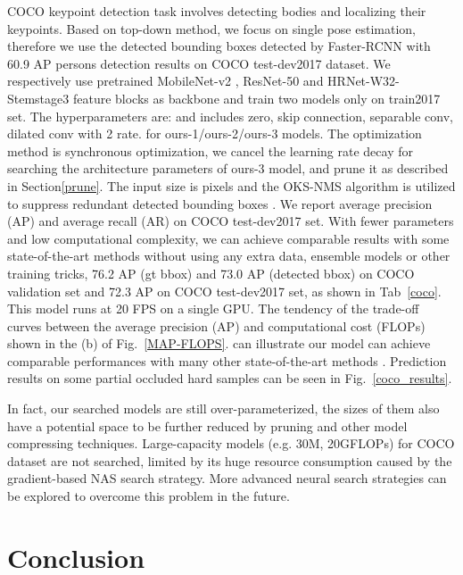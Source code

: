 \documentclass[journal]{IEEEtran}
\begin{document}
\label{cocotest}
COCO keypoint detection task involves detecting bodies and localizing their keypoints. Based on top-down method, we focus on single pose estimation, therefore we use the detected bounding boxes detected by Faster-RCNN \cite{ren2015faster} with 60.9 AP persons detection results on COCO test-dev2017 dataset. We respectively use pretrained MobileNet-v2 \cite{Sandler2018MobileNetV2IR}, ResNet-50 \cite{he2016deep} and HRNet-W32-Stemstage3 \cite{Sun_2019_CVPR} feature blocks as backbone and train two models only on train2017 set. The hyperparameters are:  and  includes zero, skip connection,  separable conv,  dilated conv with 2 rate.  for ours-1/ours-2/ours-3 models. The optimization method is synchronous optimization, we cancel the learning rate decay for searching the architecture parameters of ours-3 model, and prune it as described in Section\ref{prune}. The input size is  pixels and the OKS-NMS algorithm \cite{papandreou2017towards} is utilized to suppress redundant detected bounding boxes . We report average precision (AP) and average recall (AR) on COCO test-dev2017 set.  With fewer parameters and low computational complexity, we can achieve comparable results with some state-of-the-art methods without using any extra data, ensemble models or other training tricks, 76.2 AP (gt bbox)  and 73.0 AP (detected bbox) on COCO validation set and 72.3 AP on COCO test-dev2017 set, as shown in Tab~\ref{coco}. This model runs at 20 FPS on a single GPU. The tendency of the trade-off curves between the average precision (AP) and computational cost (FLOPs) shown in the (b) of Fig.~\ref{MAP-FLOPS}. can illustrate our model can achieve comparable performances with many other state-of-the-art methods \cite{fang2017rmpe, xiao2018simple, chen2018cascaded}. Prediction results on some partial occluded hard samples can be seen in Fig.~\ref{coco_results}.

In fact, our searched models are still over-parameterized, the sizes of them also have a potential space to be further reduced by pruning and other model compressing techniques. Large-capacity models (e.g. 30M, 20GFLOPs) for COCO dataset are not searched, limited by its huge resource consumption caused by the gradient-based NAS search strategy. More advanced neural search strategies can be explored to overcome this problem in the future.

\section{Conclusion}
\end{document}

